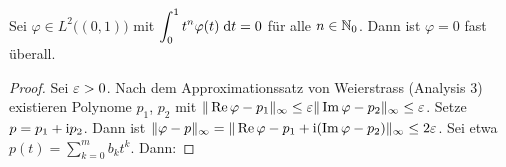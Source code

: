 \documentclass[a4paper,twoside,DIV15,BCOR12mm]{scrbook}
\begin{document}
\begin{lem}\label{lem4.7}
  Sei $\varphi\in L^2\bigl((0,1)\bigr)$ mit $\displaystyle\int_{0}^{1}{t^n\varphi(t)}\;\mathrm{d} t=0$ für alle $n\in\mathbb{N}_0$. Dann ist
  $\varphi=0$ fast überall.
\end{lem}
\begin{proof}
  Sei $\varepsilon>0$. Nach dem Approximationssatz von Weierstrass (Analysis 3) existieren Polynome $p_1$, $p_2$ mit $\|
  \operatorname{Re}{\varphi}-p_1 \|_\infty \le \varepsilon \| \operatorname{Im}{\varphi}-p_2 \|_\infty \le \varepsilon$. Setze $p=p_1+\mathrm{i} p_2$. Dann ist $\| \varphi-p
  \|_\infty = \| \operatorname{Re}{\varphi} - p_1 + \mathrm{i}(\operatorname{Im}{\varphi}-p_2) \|_\infty \leq 2\varepsilon$. Sei etwa $p(t)=\sum_{k=0}^m{b_kt^k}$. Dann:
\end{proof}
\end{document}
